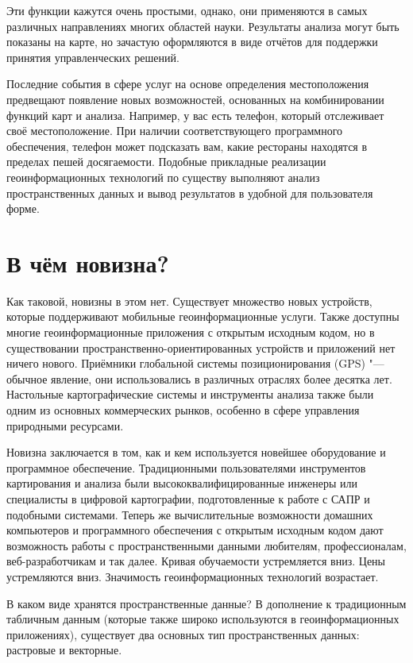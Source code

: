 Эти функции кажутся очень простыми, однако, они применяются в самых
различных направлениях многих областей науки. Результаты анализа могут
быть показаны на карте, но зачастую оформляются в виде отчётов для
поддержки принятия управленческих решений.

Последние события в сфере услуг на основе определения местоположения
предвещают появление новых возможностей, основанных на комбинировании
функций карт и анализа. Например, у вас есть телефон, который
отслеживает своё местоположение. При наличии соответствующего
программного обеспечения, телефон может подсказать вам, какие
рестораны находятся в пределах пешей досягаемости. Подобные
прикладные реализации геоинформационных технологий по существу выполняют
анализ пространственных данных и вывод результатов в удобной для пользователя
форме.

\section{В чём новизна?}\label{label_whynew}

Как таковой, новизны в этом нет. Существует множество новых устройств, которые
поддерживают мобильные геоинформационные услуги. Также доступны многие
геоинформационные приложения с открытым исходным кодом, но в
существовании пространственно-ориентированных устройств и приложений нет
ничего нового. Приёмники глобальной системы позиционирования (GPS) "--- обычное
явление, они использовались в различных отраслях более десятка лет.
Настольные картографические системы и инструменты анализа также были одним из
основных коммерческих рынков, особенно в сфере управления природными ресурсами.

Новизна заключается в том, как и кем используется новейшее оборудование и
программное обеспечение. Традиционными пользователями инструментов
картирования и анализа были высококвалифицированные инженеры или
специалисты в цифровой картографии, подготовленные к работе с
САПР и подобными системами. Теперь же вычислительные возможности
домашних компьютеров и программного обеспечения с открытым исходным
кодом дают возможность работы с пространственными данными любителям, профессионалам,
веб-разработчикам и так далее. Кривая обучаемости устремляется вниз. Цены
устремляются вниз. Значимость геоинформационных технологий возрастает.

В каком виде хранятся пространственные данные? В дополнение к традиционным
табличным данным (которые также широко используются в геоинформационных
приложениях), существует два основных тип пространственных данных: растровые и
векторные.

